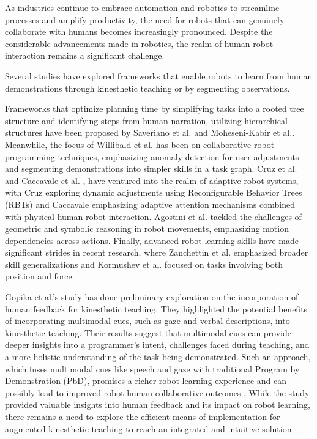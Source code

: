 \documentclass[conference]{IEEEtran}
\begin{document}
As industries continue to embrace automation and robotics to streamline processes and amplify productivity, the need for robots that can genuinely collaborate with humans becomes increasingly pronounced. Despite the considerable advancements made in robotics, the realm of human-robot interaction remains a significant challenge. 

Several studies have explored frameworks that enable robots to learn from human demonstrations through kinesthetic teaching or by segmenting observations.

Frameworks that optimize planning time by simplifying tasks into a rooted tree structure and identifying steps from human narration, utilizing hierarchical structures have been proposed by Saveriano et al. \cite{saveriano2019} and Moheseni-Kabir et al.\cite{mohseni-kabir2017}. Meanwhile, the focus of Willibald et al. \cite{willibald2020, willibald2022} has been on collaborative robot programming techniques, emphasizing anomaly detection for user adjustments and segmenting demonstrations into simpler skills in a task graph. Cruz et al. \cite{cruz2020} and Caccavale et al. \cite{caccavale2019}, \cite{caccavale2018} have ventured into the realm of adaptive robot systems, with Cruz exploring dynamic adjustments using Reconfigurable Behavior Trees (RBTs) and Caccavale emphasizing adaptive attention mechanisms combined with physical human-robot interaction. Agostini et al. \cite{agostini2020} tackled the challenges of geometric and symbolic reasoning in robot movements, emphasizing motion dependencies across actions. Finally, advanced robot learning skills have made significant strides in recent research, where Zanchettin et al. \cite{zanchettin2023} emphasized broader skill generalizations and Kormushev et al.\cite{kormushev2012} focused on tasks involving both position and force.

Gopika et al.'s \cite{Gopika2023} study has done preliminary exploration on the incorporation of human feedback for kinesthetic teaching. They highlighted the potential benefits of incorporating multimodal cues, such as gaze and verbal descriptions, into kinesthetic teaching. Their results suggest that multimodal cues can provide deeper insights into a programmer's intent, challenges faced during teaching, and a more holistic understanding of the task being demonstrated. Such an approach, which fuses multimodal cues like speech and gaze with traditional Program by Demonstration (PbD), promises a richer robot learning experience and can possibly lead to improved robot-human collaborative outcomes \cite{Gopika2023}. While the study provided valuable insights into human feedback and its impact on robot learning, there remains a need to explore the efficient means of implementation for augmented kinesthetic teaching to reach an integrated and intuitive solution.
\end{document}
